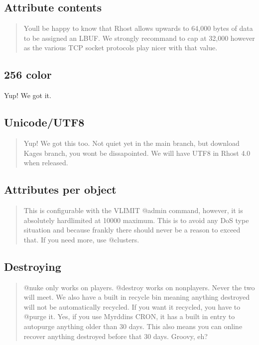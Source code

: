 \documentclass[letterpaper,10pt,english]{sphinxmanual}
\begin{document}
\subsection{Attribute contents}
\label{\detokenize{differences:attribute-contents}}\begin{quote}

\sphinxAtStartPar
You\textquotesingle{}ll be happy to know that Rhost allows upwards
to 64,000 bytes of data to be assigned an LBUF.  We strongly recommand
to cap at 32,000 however as the various TCP socket protocols play nicer
with that value.
\end{quote}


\subsection{256 color}
\label{\detokenize{differences:color}}
\sphinxAtStartPar
Yup!  We got it.


\subsection{Unicode/UTF8}
\label{\detokenize{differences:unicode-utf8}}\begin{quote}

\sphinxAtStartPar
Yup!  We got this too.  Not quiet yet in the main branch,
but download Kage\textquotesingle{}s branch, you won\textquotesingle{}t be dissapointed.  We will have
UTF8 in Rhost 4.0 when released.
\end{quote}


\subsection{Attributes per object}
\label{\detokenize{differences:attributes-per-object}}\begin{quote}

\sphinxAtStartPar
This is configurable with the VLIMIT @admin
command, however, it is absolutely hard\sphinxhyphen{}limited at 10000 maximum.
This is to avoid any DoS type situation and because frankly there
should never be a reason to exceed that.  If you need more, use
@clusters.
\end{quote}


\subsection{Destroying}
\label{\detokenize{differences:destroying}}\begin{quote}

\sphinxAtStartPar
@nuke only works on players.  @destroy works on non\sphinxhyphen{}players.
Never the two will meet.  We also have a built in recycle bin meaning
anything destroyed will not be automatically recycled.  If you want it
recycled, you have to @purge it.  Yes, if you use  Myrddin\textquotesingle{}s CRON, it
has a built in entry to auto\sphinxhyphen{}purge anything older than 30 days.  This
also means you can on\sphinxhyphen{}line recover anything destroyed before that 30
days.  Groovy, eh?
\end{quote}
\end{document}
